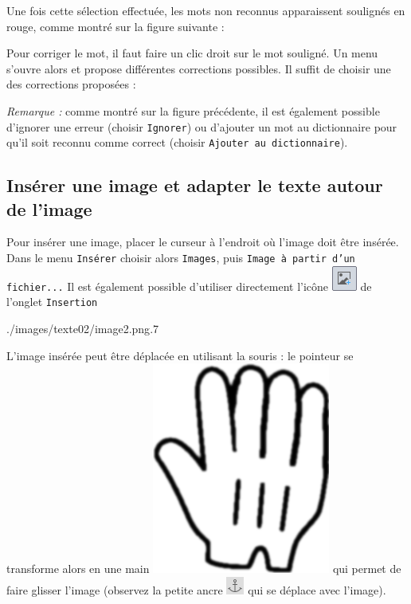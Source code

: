 
Une fois cette sélection effectuée, les mots non reconnus apparaissent soulignés en rouge, comme montré sur la figure suivante :


Pour corriger le mot, il faut faire un clic droit sur le mot souligné. Un menu s'ouvre alors et propose différentes corrections possibles. Il suffit de choisir une des corrections proposées :


\emph{Remarque :} comme montré sur la figure précédente, il est également possible d'ignorer une erreur (choisir \texttt{Ignorer}) ou d'ajouter un mot au dictionnaire pour qu'il soit reconnu comme correct (choisir \texttt{Ajouter au dictionnaire}).    




\subsection{Insérer une image et adapter le texte autour de l'image}\label{Texte2InsererImage}

Pour insérer une image, placer le curseur à l'endroit où l'image doit être insérée. Dans le menu \texttt{Insérer} choisir alors \texttt{Images}, puis \texttt{Image à partir d'un fichier...} Il est également possible d'utiliser directement l'icône \includegraphics[width=.6cm]{./images/texte02/iconeInsererImage} de l'onglet \texttt{Insertion}

%
              {./images/texte02/image2.png}{.7\textwidth}

L'image insérée peut être déplacée en utilisant la souris : le pointeur se transforme alors en une main \includegraphics[width=.3cm]{./images/texte02/pointeurMain} qui permet de faire glisser l'image (observez la petite ancre \includegraphics[width=.4cm]{./images/texte02/iconeAncre} qui se déplace avec l'image).



